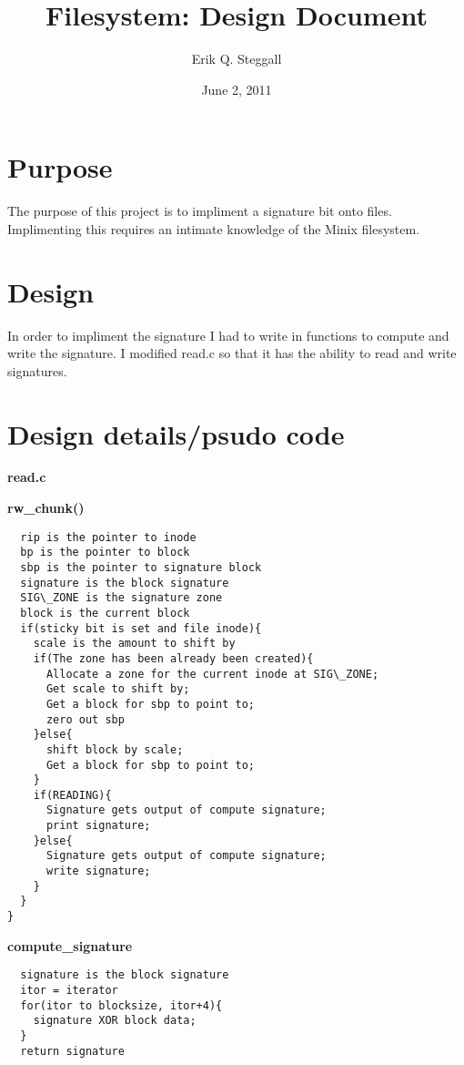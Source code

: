 \documentclass[a4paper, 12pt]{article}
\title{Filesystem: Design Document}
\date{June 2, 2011}
\author{Erik Q. Steggall}
\begin{document}
\maketitle

\section{Purpose}
The purpose of this project is to impliment a signature bit onto files. Implimenting this requires an intimate knowledge of the Minix filesystem.\\

\section{Design}
In order to impliment the signature I had to write in functions to compute and write the signature. I modified read.c so that it has the ability to read and write signatures.\\

\section{Design details/psudo code}

{\bf read.c}


{\bf rw\_chunk()}\\
\begin{verbatim}
  rip is the pointer to inode
  bp is the pointer to block
  sbp is the pointer to signature block
  signature is the block signature 
  SIG\_ZONE is the signature zone
  block is the current block
  if(sticky bit is set and file inode){
    scale is the amount to shift by
    if(The zone has been already been created){
      Allocate a zone for the current inode at SIG\_ZONE;
      Get scale to shift by;
      Get a block for sbp to point to;
      zero out sbp
    }else{
      shift block by scale;
      Get a block for sbp to point to;  
    }
    if(READING){
      Signature gets output of compute signature;
      print signature;
    }else{
      Signature gets output of compute signature;
      write signature;
    } 
  } 
}      
\end{verbatim}

{\bf compute\_signature}\\
\begin{verbatim}
  signature is the block signature
  itor = iterator
  for(itor to blocksize, itor+4){
    signature XOR block data;
  }
  return signature
\end{verbatim}
\end{document}
